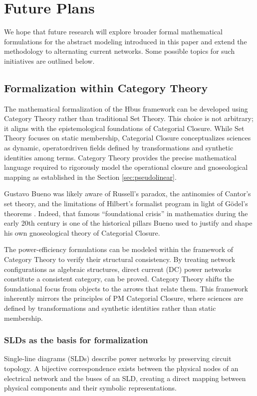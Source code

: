 \documentclass[11pt, a4paper]{article}
\begin{document}
\section{Future Plans} \label{sec:future}

We hope that future research will explore broader formal mathematical formulations for the abstract modeling introduced in this paper and extend the methodology to alternating current networks. Some possible topics for such initiatives are outlined below.

\subsection{Formalization within Category Theory} \label{sec:formalcath}

The mathematical formalization of the Hbus framework can be developed using Category Theory rather than traditional Set Theory. This choice is not arbitrary; it aligns with the epistemological foundations of Categorial Closure. While Set Theory focuses on static membership, Categorial Closure conceptualizes sciences as dynamic, operatordriven fields defined by transformations and synthetic identities among terms.  Category Theory provides the precise mathematical language required to rigorously model the operational closure and gnoseological mapping as established in the Section \ref{sec:pseudolinear}.

Gustavo Bueno was likely aware of Russell's paradox, the antinomies of Cantor's set theory, and the limitations of Hilbert's formalist program in light of Gödel's theorems \cite{godel1931}. Indeed, that famous ``foundational crisis'' in mathematics during the early 20th century is one of the historical pillars Bueno used to justify and shape his own gnoseological theory of Categorial Closure.

The power-efficiency formulations can be modeled within the framework of Category Theory to verify their structural consistency. By treating network configurations as algebraic structures, direct current (DC) power networks constitute a consistent category, can be proved. Category Theory shifts the foundational focus from objects to the arrows that relate them. This framework inherently mirrors the principles of PM Categorial Closure, where sciences are defined by transformations and synthetic identities rather than static membership.

\subsubsection{SLDs as the basis for formalization}
Single-line diagrams (SLDs) describe power networks by preserving circuit topology. A bijective correspondence exists between the physical nodes of an electrical network and the buses of an SLD, creating a direct mapping between physical components and their symbolic representations.
\end{document}
